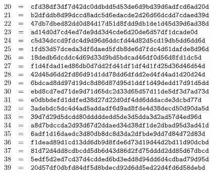 \begin{multicols}{2}
\[\begin{array}{rcl}
\end{array}\\
\begin{array}{rcl}
20 &=& \texttt{cfd38df3df7d42dc0ddbdd5d53de6d9bd39d6adfcd6ad20d} \\
21 &=& \texttt{b2dfddb8d99dccd8adc5d6edacde2d26d66dcdd7cdaed39d} \\
22 &=& \texttt{47db7dbed82dd0d84d17d51d8fdd9db1de1d45d39d6ad38d} \\
23 &=& \texttt{ad14d0d7cd4ed7de9dd3d4cde6d20de6d57df1dcade0d} \\
24 &=& \texttt{c5d34dccd9fdc4d9d96d6ddcfd44d82d5cd19db5dd6dd6d} \\
25 &=& \texttt{1fd53d57dceda3df6daed5fdb8de6d7fdc4d61dafde8d96d} \\
26 &=& \texttt{18dedb6dcddc4d69d33d9bd5bdcad46df0d56d8fd1dc5d} \\
27 &=& \texttt{f1d4fdad1ed86db0d7dd2fd41df1df4d1fd25d36d46d54d} \\
28 &=& \texttt{42d45d6dd2fd86d91d1dd78dd6dfdd2ed4fd4ad1d20d24d} \\
29 &=& \texttt{6bdcad8dd97d19dc8d86d87d95d1ddf1d49dedd17d91d5dd} \\
30 &=& \texttt{ebd8cd7ed71de9d71d65dc2d33d65d57d11de5df3d7ad73d} \\
31 &=& \texttt{e0dbbdefd1ddfed38d27d22d0df4dd6dddacde3dcbd77d} \\
32 &=& \texttt{3adebdc5dc4d4ad5addadf6d9ad8fde4d38decd50d90da5d} \\
33 &=& \texttt{39d7d29d5dcdd80dddddedd5de3d5dda3d2ad57d4ed96d} \\
34 &=& \texttt{a8d7bdccda2d93d67d2ddaed34d38df1de2dbad95d3ad41d} \\
35 &=& \texttt{6adf1d16daedc3d80db8dc8d3da2dfbde9dd7d84d72d83d} \\
36 &=& \texttt{f1dead89d1cd13dd6db9d8fde6d73d19d44d2bd11d90dcbd} \\
37 &=& \texttt{81d72d4dd8cdbcdd5db6d43d86d2fd75dddd2dd85d67dbcd} \\
38 &=& \texttt{5edf5d2ed7cd37d4cdded6bd3edd8d94dd6d4cdbad79d95d} \\
39 &=& \texttt{20d57df0dbfd84df5d8bdecd92d6dd5ed22d4fd6d58debd} \\
\end{array}\\
\]\end{multicols}
